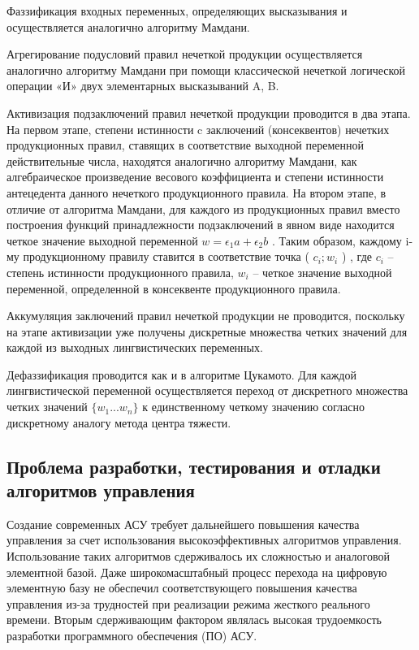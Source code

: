 Фаззификация входных переменных, определяющих высказывания и осуществляется аналогично алгоритму Мамдани.

Агрегирование подусловий правил нечеткой продукции осуществляется аналогично алгоритму Мамдани при помощи классической нечеткой логической операции «И» двух элементарных высказываний A, B.

Активизация подзаключений правил нечеткой продукции проводится в два этапа. На первом этапе, степени истинности c заключений (консеквентов) нечетких продукционных правил, ставящих в соответствие выходной переменной действительные числа, находятся аналогично алгоритму Мамдани, как алгебраическое произведение весового коэффициента и степени истинности антецедента данного нечеткого продукционного правила. На втором этапе, в отличие от алгоритма Мамдани, для каждого из продукционных правил вместо построения функций принадлежности подзаключений в явном виде находится четкое значение выходной переменной $w= \epsilon_1 a+ \epsilon_2 b$ . Таким образом, каждому i-му продукционному правилу ставится в соответствие точка ( $c_i; w_i$ ) , где $c_i$ – степень истинности продукционного правила, $w_i$ – четкое значение выходной переменной, определенной в консеквенте продукционного правила.

Аккумуляция заключений правил нечеткой продукции не проводится, поскольку на этапе активизации уже получены дискретные множества четких значений для каждой из выходных лингвистических переменных.

Дефаззификация проводится как и в алгоритме Цукамото. Для каждой лингвистической переменной осуществляется переход от дискретного множества четких значений $\{w_1...w_n\}$ к единственному четкому значению согласно дискретному аналогу метода центра тяжести.


\subsection{Проблема разработки, тестирования и отладки алгоритмов управления}
\label{sec:domain:4}

Создание современных АСУ требует дальнейшего повышения качества управления за счет использования высокоэффективных алгоритмов управления. Использование таких алгоритмов сдерживалось их сложностью и аналоговой элементной базой. Даже широкомасштабный процесс перехода на цифровую элементную базу не обеспечил соответствующего повышения качества управления из-за трудностей при реализации режима жесткого реального времени. Вторым сдерживающим фактором являлась высокая трудоемкость разработки программного обеспечения (ПО) АСУ.

